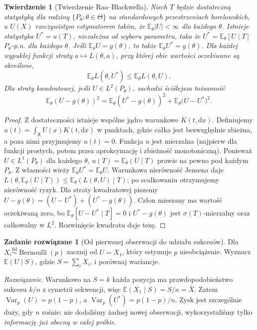 \documentclass[11pt,a4paper,oneside]{report}
\numberwithin{equation}{chapter}
\theoremstyle{plain}
\newtheorem{twierdzenie}{Twierdzenie}[chapter]
\theoremstyle{definition}
\newtheorem{zadanie}{Zadanie rozwiązane}[chapter]
\theoremstyle{remark}
\newcommand{\E}{\mathbb E}
\newcommand{\Var}{\operatorname{Var}}
\newcommand{\dd}{\mathrm d}
\newcommand{\iid}{\mathrel{\overset{\mathrm{iid}}\sim}}
\begin{document}
\begin{twierdzenie}[Twierdzenie Rao--Blackwella]\label{thm:rao-blackwell}
Niech $T$ będzie dostateczną statystyką dla rodziny
$\{P_\theta:\theta\in\Theta\}$ na standardowych przestrzeniach
borelowskich, a $U(X)$ rzeczywistym estymatorem takim, że
$\E_\theta|U|<\infty$ dla każdego $\theta$. Istnieje statystyka
$U^*=u(T)$, \emph{niezależna od wyboru parametru}, taka że
$U^*=\E_\theta[U\mid T]$ $P_\theta$-p.n. dla każdego $\theta$.
Jeśli $\E_\theta U=g(\theta)$, to także
$\E_\theta U^*=g(\theta)$.
Dla każdej wypukłej funkcji straty $a\mapsto L(\theta,a)$,
przy której obie wartości oczekiwane są określone,
\[
\E_\theta L(\theta,U^*)\le\E_\theta L(\theta,U).
\]
Dla straty kwadratowej, jeśli $U\in L^2(P_\theta)$, zachodzi
ściślejsza tożsamość
\[
\E_\theta(U-g(\theta))^2
=\E_\theta(U^*-g(\theta))^2
 +\E_\theta\bigl(U-U^*\bigr)^2.
\]
\end{twierdzenie}
\begin{proof}
Z dostateczności istnieje wspólne jądro warunkowe $K(t,\dd x)$.
Definiujemy $u(t)=\int_{\mathsf X}U(x)K(t,\dd x)$ w punktach, gdzie całka
jest bezwzględnie zbieżna, a poza nimi przyjmujemy $u(t)=0$.
Funkcja $u$ jest mierzalna (najpierw dla funkcji prostych,
potem przez aproksymację i zbieżność monotoniczną).
Ponieważ $U\in L^1(P_\theta)$ dla każdego $\theta$,
$u(T)=\E_\theta(U\mid T)$ prawie na pewno pod każdym $P_\theta$.
Z własności wieży $\E_\theta U^*=\E_\theta U$.
Warunkowa nierówność Jensena daje
$L(\theta,\E_\theta(U\mid T))\le
\E_\theta(L(\theta,U)\mid T)$;
po scałkowaniu otrzymujemy nierówność ryzyk.
Dla straty kwadratowej piszemy
$U-g(\theta)=(U-U^*)+(U^*-g(\theta))$.
Człon mieszany ma wartość oczekiwaną zero, bo
$\E_\theta[U-U^*\mid T]=0$ i $U^*-g(\theta)$ jest
$\sigma(T)$-mierzalny oraz całkowalny w $L^2$.
Rozwinięcie kwadratu daje tezę.
\end{proof}

\begin{zadanie}[Od pierwszej obserwacji do udziału sukcesów]
Dla $X_i\iid\operatorname{Bernoulli}(p)$ zacznij od
$U=X_1$, który estymuje $p$ nieobciążenie.
Wyznacz $\E(U\mid S)$, gdzie $S=\sum_iX_i$, i porównaj wariancje.
\par\emph{Rozwiązanie.} Warunkowo na $S=k$ każda pozycja
ma prawdopodobieństwo sukcesu $k/n$ z symetrii sekwencji,
więc $\E(X_1\mid S)=S/n=\bar X$.
Zatem $\Var_p(U)=p(1-p)$,
a $\Var_p(U^*)=p(1-p)/n$.
Zysk jest szczególnie duży, gdy $n$ rośnie: nie dodaliśmy
żadnej nowej obserwacji, wykorzystaliśmy tylko \emph{informację
już obecną w całej próbie}.
\end{zadanie}
\end{document}
